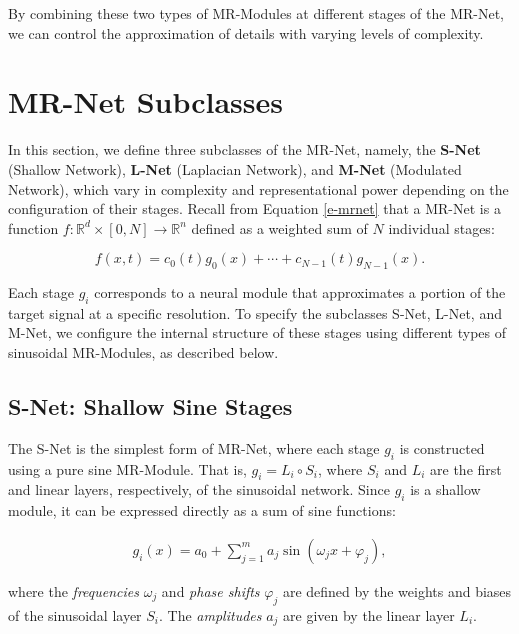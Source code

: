 By combining these two types of MR-Modules at different stages of the MR-Net, we can control the approximation of details with varying levels of complexity.



\section{MR-Net Subclasses}

In this section, we define three subclasses of the MR-Net, namely, the \textbf{S-Net} (Shallow Network), \textbf{L-Net} (Laplacian Network), and \textbf{M-Net} (Modulated Network), which vary in complexity and representational power depending on the configuration of their stages. Recall from Equation \ref{e-mrnet} that a MR-Net is a function \( f : \mathbb{R}^d \times [0, N] \to \mathbb{R}^n \) defined as a weighted sum of \( N \) individual stages:

\[
f(x, t) = c_0(t)g_0(x) + \cdots + c_{N-1}(t)g_{N-1}(x).
\]

Each stage \( g_i \) corresponds to a neural module that approximates a portion of the target signal at a specific resolution. To specify the subclasses S-Net, L-Net, and M-Net, we configure the internal structure of these stages using different types of sinusoidal MR-Modules, as described below.

\subsection{S-Net: Shallow Sine Stages}

The S-Net is the simplest form of MR-Net, where each stage \( g_i \) is constructed using a pure sine MR-Module. That is, \( g_i = L_i \circ S_i \), where \( S_i \) and \( L_i \) are the first and linear layers, respectively, of the sinusoidal network. Since \( g_i \) is a shallow module, it can be expressed directly as a sum of sine functions:

\begin{align}
    g_i(x) = a_0 + \sum_{j=1}^m a_j \sin\left(\omega_j x + \varphi_j\right),
\end{align}


where the \textit{frequencies} \( \omega_j \) and \textit{phase shifts} \( \varphi_j \) are defined by the weights and biases of the sinusoidal layer \( S_i \). The \textit{amplitudes} \( a_j \) are given by the linear layer \( L_i \).

